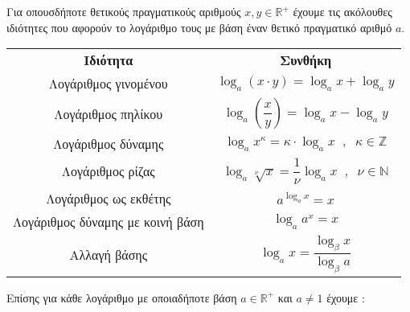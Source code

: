 \documentclass[twoside,nofonts,internet,shmeiwseis]{thewria}
\begin{document}
\begin{center}
\end{center}
Για οπουσδήποτε θετικούς πραγματικούς αριθμούς $ x,y\in\mathbb{R}^+ $ έχουμε τις ακόλουθες ιδιότητες που αφορούν το λογάριθμο τους με βάση έναν θετικό πραγματικό αριθμό $ a $.
\begin{center}
\begin{longtable}{cc}
\hline \rule[-2ex]{0pt}{5.5ex} \textbf{Ιδιότητα} & \textbf{Συνθήκη} \\
\hhline{==}\rule[-2ex]{0pt}{5.5ex} Λογάριθμος γινομένου & $ \log_{a}(x\cdot y)=\log_{a}x+\log_{a}y $ \\
\rule[-2ex]{0pt}{5.5ex}  Λογάριθμος πηλίκου & $ \log_{a}\left( \dfrac{x}{y}\right) =\log_{a}x-\log_{a}y $ \\
\rule[-2ex]{0pt}{5.5ex}  Λογάριθμος δύναμης & $ \log_{a}x^\kappa=\kappa\cdot\log_{a}x\;\;,\;\;\kappa\in\mathbb{Z} $ \\
\rule[-2ex]{0pt}{5.5ex}  Λογάριθμος ρίζας & $ \log_{a}\!\sqrt[\nu]{x}=\dfrac{1}{\nu}\log_{a}x\;\;,\;\;\nu\in\mathbb{N} $ \\
\rule[-2ex]{0pt}{5.5ex}  Λογάριθμος ως εκθέτης & $ a^{\log_{a}x}=x $ \\
\rule[-2ex]{0pt}{5.5ex}  Λογάριθμος δύναμης με κοινή βάση & $ \log_{a}a^x=x $ \\
\rule[-2ex]{0pt}{5.5ex}  Αλλαγή βάσης & $ \log_{a}x=\dfrac{\log_{\beta}{x}}{\log_{\beta}{a}} $ \\
\hline
\end{longtable}
\end{center}
Επίσης για κάθε λογάριθμο με οποιαδήποτε βάση $ a\in\mathbb{R}^+ $ και $ a\neq1 $ έχουμε :
\end{document}
